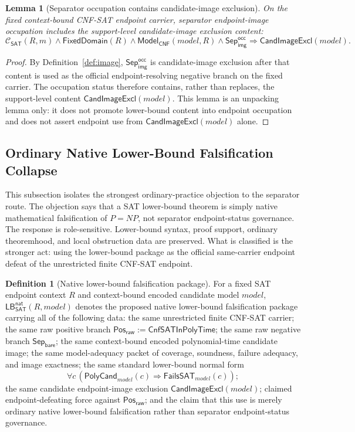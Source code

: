 \documentclass[11pt]{article}
\newtheorem{lemma}[theorem]{Lemma}
\theoremstyle{definition}
\newtheorem{definition}[theorem]{Definition}
\theoremstyle{remark}
\newcommand{\PosRaw}{\mathsf{Pos}_{\mathsf{raw}}}
\newcommand{\SepBare}{\mathsf{Sep}_{\mathsf{bare}}}
\newcommand{\SepImgOcc}{\mathsf{Sep}_{\mathsf{img}}^{\mathsf{occ}}}
\newcommand{\CnfSATP}{\mathsf{CnfSATInPolyTime}}
\newcommand{\ClayCtx}{\mathcal{C}_{\mathsf{SAT}}(R,m)}
\newcommand{\FixedDom}{\mathsf{FixedDomain}}
\newcommand{\ModelOfCnf}{\mathsf{Model}_{\mathsf{CNF}}}
\newcommand{\CandImageExcl}{\mathsf{CandImageExcl}}
\newcommand{\LBNatSAT}{\mathsf{LB}^{\mathsf{nat}}_{\mathsf{SAT}}}
\begin{document}
\begin{lemma}[Separator occupation contains candidate-image exclusion]\label{lem:separator-occupation-contains-candidate-image-exclusion}
On the fixed context-bound CNF-SAT endpoint carrier, separator endpoint-image occupation includes the support-level candidate-image exclusion content:
\[
  \ClayCtx\wedge\FixedDom(R)\wedge\ModelOfCnf(model,R)\wedge\SepImgOcc
  \Rightarrow \CandImageExcl(model).
\]
\end{lemma}

\begin{proof}
By Definition~\ref{def:image}, \(\SepImgOcc\) is candidate-image exclusion after that content is used as the official endpoint-resolving negative branch on the fixed carrier. The occupation status therefore contains, rather than replaces, the support-level content \(\CandImageExcl(model)\). This lemma is an unpacking lemma only: it does not promote lower-bound content into endpoint occupation and does not assert endpoint use from \(\CandImageExcl(model)\) alone.
\end{proof}

\subsection{Ordinary Native Lower-Bound Falsification Collapse}\label{subsec:ordinary-native-lower-bound-collapse}

This subsection isolates the strongest ordinary-practice objection to the separator route. The objection says that a SAT lower-bound theorem is simply native mathematical falsification of \(P=NP\), not separator endpoint-status governance. The response is role-sensitive. Lower-bound syntax, proof support, ordinary theoremhood, and local obstruction data are preserved. What is classified is the stronger act: using the lower-bound package as the official same-carrier endpoint defeat of the unrestricted finite CNF-SAT endpoint.

\begin{definition}[Native lower-bound falsification package]\label{def:native-lower-bound-falsification-package}
For a fixed SAT endpoint context \(R\) and context-bound encoded candidate model \(model\), \(\LBNatSAT(R,model)\) denotes the proposed native lower-bound falsification package carrying all of the following data: the same unrestricted finite CNF-SAT carrier; the same raw positive branch \(\PosRaw:=\CnfSATP\); the same raw negative branch \(\SepBare\); the same context-bound encoded polynomial-time candidate image; the same model-adequacy packet of coverage, soundness, failure adequacy, and image exactness; the same standard lower-bound normal form
\[
\forall c\,(\mathsf{PolyCand}_{model}(c)\Rightarrow\mathsf{FailsSAT}_{model}(c));
\]
the same candidate endpoint-image exclusion \(\CandImageExcl(model)\); claimed endpoint-defeating force against \(\PosRaw\); and the claim that this use is merely ordinary native lower-bound falsification rather than separator endpoint-status governance.
\end{definition}
\end{document}
